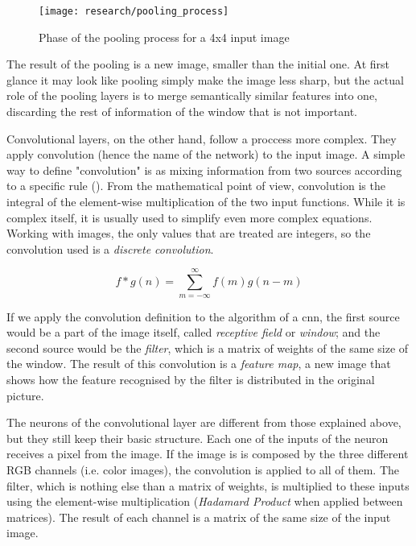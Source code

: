 \begin{figure}[!ht]
	\centering
	\vspace{0.3cm}
	\texttt{[image: research/pooling\_process]}
	\caption{Phase of the pooling process for a 4x4 input image}
	\label{fig:pooling_proc}
\end{figure}

The result of the pooling is a new image, smaller than the initial one. At first glance it may look like pooling simply make the image less sharp, but the actual role of the pooling layers is to merge semantically similar features into one, discarding the rest of information of the window that is not important.

Convolutional layers, on the other hand, follow a proccess more complex. They apply convolution (hence the name of the network) to the input image. A simple way to define "convolution" is as mixing information from two sources according to a specific rule (\cite{lecun2015deep}). From the mathematical point of view, convolution is the integral of the element-wise multiplication of the two input functions. While it is complex itself, it is usually used to simplify even more complex equations. Working with images, the only values that are treated are integers, so the convolution used is a \textit{discrete convolution}. 

\begin{equation}
	\label{discrete_conv}
	f*g(n) = \sum_{m= -\infty}^{\infty} f(m) g(n-m) 
\end{equation}

If we apply the convolution definition to the algorithm of a \gls{cnn}, the first source would be a part of the image itself, called \textit{receptive field} or \textit{window}; and the second source would be the \textit{filter}, which is a matrix of weights of the same size of the window. The result of this convolution is a \textit{feature map}, a new image that shows how the feature recognised by the filter is distributed in the original picture. 

The neurons of the convolutional layer are different from those explained above, but they still keep their basic structure. Each one of the inputs of the neuron receives a pixel from the image. If the image is is composed by the three different RGB channels (i.e. color images), the convolution is applied to all of them. The filter, which is nothing else than a matrix of weights, is multiplied to these inputs using the element-wise multiplication (\textit{Hadamard Product} when applied between matrices). The result of each channel is a matrix of the same size of the input image. 


